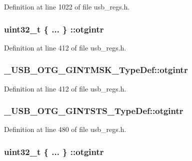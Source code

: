 Definition at line 1022 of file usb\-\_\-regs.\-h.

\hypertarget{group___u_s_b___o_t_g___d_r_i_v_e_r_ga0024fb41873476229ed21814f42828f8}{
\subsubsection[{otgintr}]{\setlength{\rightskip}{0pt plus 5cm}uint32\-\_\-t \{ ... \} \-::otgintr}}\label{group___u_s_b___o_t_g___d_r_i_v_e_r_ga0024fb41873476229ed21814f42828f8}


Definition at line 412 of file usb\-\_\-regs.\-h.

\hypertarget{group___u_s_b___o_t_g___d_r_i_v_e_r_ga148fbc7761867493dd8af7b29cc5e764}{
\subsubsection[{otgintr}]{ \-\_\-\-U\-S\-B\-\_\-\-O\-T\-G\-\_\-\-G\-I\-N\-T\-M\-S\-K\-\_\-\-Type\-Def\-::otgintr}}\label{group___u_s_b___o_t_g___d_r_i_v_e_r_ga148fbc7761867493dd8af7b29cc5e764}


Definition at line 412 of file usb\-\_\-regs.\-h.

\hypertarget{group___u_s_b___o_t_g___d_r_i_v_e_r_ga8c6022a9b96f1a881f956e7bafe64497}{
\subsubsection[{otgintr}]{ \-\_\-\-U\-S\-B\-\_\-\-O\-T\-G\-\_\-\-G\-I\-N\-T\-S\-T\-S\-\_\-\-Type\-Def\-::otgintr}}\label{group___u_s_b___o_t_g___d_r_i_v_e_r_ga8c6022a9b96f1a881f956e7bafe64497}


Definition at line 480 of file usb\-\_\-regs.\-h.

\hypertarget{group___u_s_b___o_t_g___d_r_i_v_e_r_gabc1fc8ab5d00c6fdeff022c07cc83c75}{
\subsubsection[{otgintr}]{\setlength{\rightskip}{0pt plus 5cm}uint32\-\_\-t \{ ... \} \-::otgintr}}\label{group___u_s_b___o_t_g___d_r_i_v_e_r_gabc1fc8ab5d00c6fdeff022c07cc83c75}


